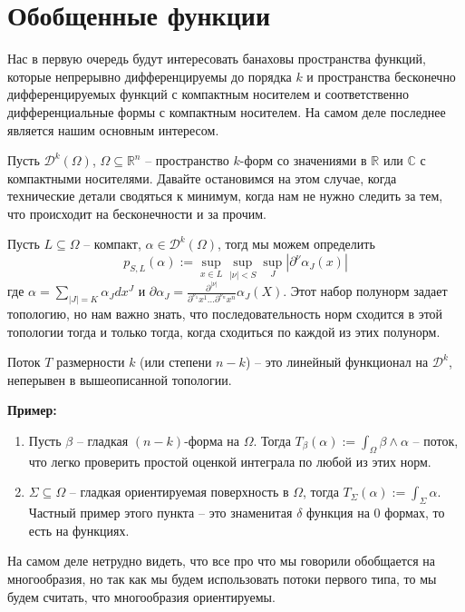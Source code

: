 \section{Обобщенные функции}
Нас в первую очередь будут интересовать банаховы пространства функций, которые
непрерывно дифференцируемы до порядка $k$ и пространства бесконечно
дифференцируемых функций с компактным носителем и соответственно дифференциальные
формы с компактным носителем. На самом деле последнее является нашим основным
интересом.

Пусть $\mathcal D^k(\Omega)$, $\Omega\subseteq\mathbb R^n$ – пространство
$k$-форм со значениями в $\mathbb R$ или $\mathbb C$ с компактными носителями.
Давайте остановимся на этом случае, когда технические детали сводяться к минимум,
когда нам не нужно следить за тем, что происходит на бесконечности и за прочим.

Пусть $L\subseteq\Omega$ – компакт, $\alpha\in\mathcal D^k(\Omega)$, тогд мы
можем определить
\[p_{S,L}(\alpha):=\sup_{x\in L}\sup_{|\nu|<S}
\sup_J|\partial^{\nu}\alpha_J(x)|\]
где $\alpha=\sum_{|J|=K}\alpha_Jdx^{J}$ и $\partial\alpha_J=\frac{\partial^{|\nu|}}
{\partial^{\nu_1}x^1\ldots\partial^{\nu_n}x^n}\alpha_J(X)$. Этот набор полунорм
задает топологию, но нам важно знать, что последовательность норм сходится в
этой топологии тогда и только тогда, когда сходиться по каждой из этих полунорм.

\opr Поток $T$ размерности $k$ (или степени $n-k$) – это линейный функционал на
$\mathcal D^k$, неперывен в вышеописанной топологии.

\textbf{Пример:}
\begin{enumerate}
    \item Пусть $\beta$ – гладкая $(n-k)$-форма на $\Omega$. Тогда $T_\beta(\alpha)
        :=\int_\Omega\beta\wedge\alpha$ – поток, что легко проверить простой
        оценкой интеграла по любой из этих норм.
    \item $\Sigma\subseteq\Omega$ – гладкая ориентируемая поверхность в $\Omega$,
        тогда $T_\Sigma(\alpha):=\int_\Sigma\alpha$. Частный пример этого пункта
        – это знаменитая $\delta$ функция на $0$ формах, то есть на функциях.
\end{enumerate}

На самом деле нетрудно видеть, что все про что мы говорили обобщается на
многообразия, но так как мы будем использовать потоки первого типа, то мы будем
считать, что многообразия ориентируемы.
